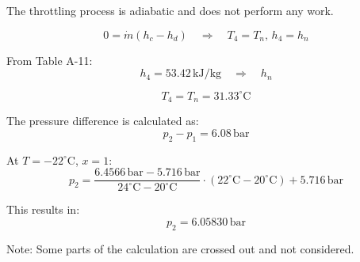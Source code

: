 The throttling process is adiabatic and does not perform any work.  

\[
0 = \dot{m} \left( h_c - h_d \right) \quad \Rightarrow \quad T_4 = T_n, \, h_4 = h_n
\]

From Table A-11:  
\[
h_4 = 53.42 \, \text{kJ/kg} \quad \Rightarrow \quad h_n
\]

\[
T_4 = T_n = 31.33^\circ\text{C}
\]

The pressure difference is calculated as:  
\[
p_2 - p_1 = 6.08 \, \text{bar}
\]

At \( T = -22^\circ\text{C} \), \( x = 1 \):  
\[
p_2 = \frac{6.4566 \, \text{bar} - 5.716 \, \text{bar}}{24^\circ\text{C} - 20^\circ\text{C}} \cdot (22^\circ\text{C} - 20^\circ\text{C}) + 5.716 \, \text{bar}
\]

This results in:  
\[
p_2 = 6.05830 \, \text{bar}
\]  

Note: Some parts of the calculation are crossed out and not considered.